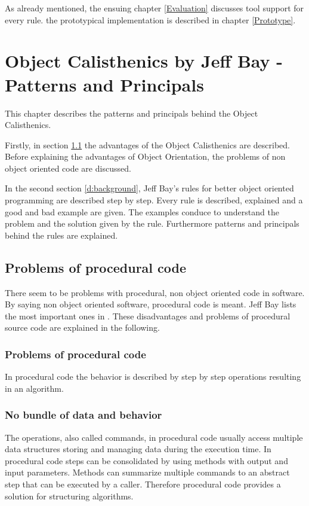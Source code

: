 As already mentioned, the ensuing chapter \ref{Evaluation} discusses tool support for every rule.  the prototypical implementation is described in chapter \ref{Prototype}.

\chapter{Object Calisthenics by Jeff Bay - Patterns and Principals}
\label{Description}
This chapter describes the patterns and principals behind the Object Calisthenics. 

Firstly, in section \ref{d:problemsprocedural} the advantages of the Object Calisthenics are described. Before explaining the advantages of Object Orientation, the problems of non object oriented code are discussed. 

In the second section \ref{d:background}, Jeff Bay's rules for better object oriented programming are described step by step. Every rule is described, explained and a good and bad example are given. The examples conduce to understand the problem and the solution given by the rule. Furthermore patterns and principals behind the rules are explained. 

\section{Problems of procedural code}
\label{d:problemsprocedural}
There seem to be problems with procedural, non object oriented code in software. By saying non object oriented software, procedural code is meant. Jeff Bay lists the most important ones in \cite[p.70]{oc2008}. These disadvantages and problems of procedural source code are explained in the following. 

\subsection{Problems of procedural code} 
In procedural code the behavior is described by step by step operations resulting in an algorithm. 

\subsection*{No bundle of data and behavior}
The operations, also called commands, in procedural code usually access multiple data structures storing and managing data during the execution time. In procedural code steps can be consolidated by using methods with output and input parameters. Methods can summarize multiple commands to an abstract step that can be executed by a caller. Therefore procedural code provides a solution for structuring algorithms.\\

